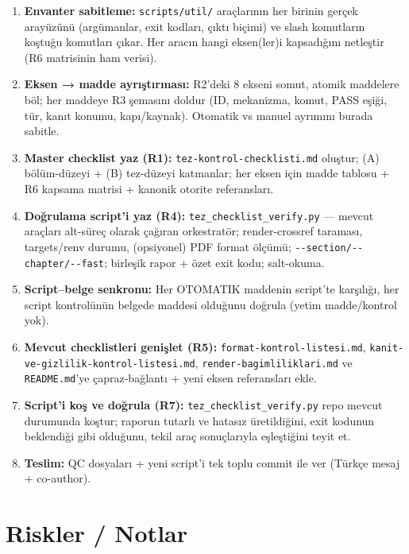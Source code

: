 \documentclass[
  turkish,
  12pt,
  a4paper,
]{report}
\providecommand{\tightlist}{%
  \setlength{\itemsep}{0pt}\setlength{\parskip}{0pt}}
\begin{document}
\begin{enumerate}
\def\labelenumi{\arabic{enumi}.}
\tightlist
\item
  \textbf{Envanter sabitleme:} \texttt{scripts/util/} araçlarının her
  birinin gerçek arayüzünü (argümanlar, exit kodları, çıktı biçimi) ve
  slash komutların koştuğu komutları çıkar. Her aracın hangi eksen(ler)i
  kapsadığını netleştir (R6 matrisinin ham verisi).
\item
  \textbf{Eksen → madde ayrıştırması:} R2'deki 8 ekseni somut, atomik
  maddelere böl; her maddeye R3 şemasını doldur (ID, mekanizma, komut,
  PASS eşiği, tür, kanıt konumu, kapı/kaynak). Otomatik vs manuel
  ayrımını burada sabitle.
\item
  \textbf{Master checklist yaz (R1):} \texttt{tez-kontrol-checklisti.md}
  oluştur; (A) bölüm-düzeyi + (B) tez-düzeyi katmanlar; her eksen için
  madde tablosu + R6 kapsama matrisi + kanonik otorite referansları.
\item
  \textbf{Doğrulama script'i yaz (R4):}
  \texttt{tez\_checklist\_verify.py} --- mevcut araçları alt-süreç
  olarak çağıran orkestratör; render-crossref taraması, targets/renv
  durumu, (opsiyonel) PDF format ölçümü;
  \texttt{-\/-section/-\/-chapter/-\/-fast}; birleşik rapor + özet exit
  kodu; salt-okuma.
\item
  \textbf{Script--belge senkronu:} Her OTOMATIK maddenin script'te
  karşılığı, her script kontrolünün belgede maddesi olduğunu doğrula
  (yetim madde/kontrol yok).
\item
  \textbf{Mevcut checklistleri genişlet (R5):}
  \texttt{format-kontrol-listesi.md},
  \texttt{kanit-ve-gizlilik-kontrol-listesi.md},
  \texttt{render-bagimliliklari.md} ve \texttt{README.md}'ye
  çapraz-bağlantı + yeni eksen referansları ekle.
\item
  \textbf{Script'i koş ve doğrula (R7):}
  \texttt{tez\_checklist\_verify.py} repo mevcut durumunda koştur;
  raporun tutarlı ve hatasız üretildiğini, exit kodunun beklendiği gibi
  olduğunu, tekil araç sonuçlarıyla eşleştiğini teyit et.
\item
  \textbf{Teslim:} QC dosyaları + yeni script'i tek toplu commit ile ver
  (Türkçe mesaj + co-author).
\end{enumerate}

\section{Riskler / Notlar}\label{riskler-notlar}
\end{document}
